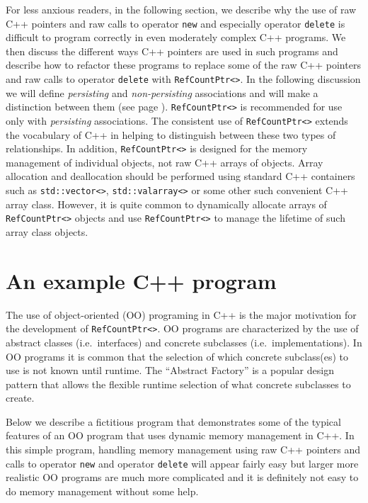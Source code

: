 \documentclass[pdf,ps2pdf,11pt]{SANDreport}
\begin{document}
For less anxious readers, in the following section, we describe why
the use of raw C++ pointers and raw calls to operator {}\texttt{new}
and especially operator {}\texttt{delete} is difficult to program
correctly in even moderately complex C++ programs.  We then discuss
the different ways C++ pointers are used in such programs and describe
how to refactor these programs to replace some of the raw C++ pointers
and raw calls to operator {}\texttt{delete} with
{}\texttt{Ref\-Count\-Ptr<>}.  In the following discussion we will
define {}\textit{persisting} and {}\textit{non-persisting}
associations and will make a distinction between them (see page
{}\pageref{rcp:non-persisting-defined}).  {}\texttt{Ref\-Count\-Ptr<>}
is recommended for use only with {}\textit{persisting} associations.
The consistent use of {}\texttt{Ref\-Count\-Ptr<>} extends the
vocabulary of C++ in helping to distinguish between these two types of
relationships.  In addition, {}\texttt{Ref\-Count\-Ptr<>} is designed
for the memory management of individual objects, not raw C++ arrays of
objects.  Array allocation and deallocation should be performed using
standard C++ containers such as {}\texttt{std\-::vector<>},
{}\texttt{std\-::valarray<>} or some other such convenient C++ array
class.  However, it is quite common to dynamically allocate arrays of
{}\texttt{Ref\-Count\-Ptr<>} objects and use
{}\texttt{Ref\-Count\-Ptr<>} to manage the lifetime of such array
class objects.

%
\section{An example C++ program}
%

The use of object-oriented (OO) programing in C++ is the major
motivation for the development of {}\texttt{Ref\-Count\-Ptr<>}.  OO
programs are characterized by the use of abstract classes
(i.e.~interfaces) and concrete subclasses (i.e.~implementations).  In
OO programs it is common that the selection of which concrete
subclass(es) to use is not known until runtime.  The ``Abstract
Factory'' {}\cite{ref:gama_et_al_1995} is a popular design pattern
that allows the flexible runtime selection of what concrete subclasses
to create.

Below we describe a fictitious program that demonstrates some of the
typical features of an OO program that uses dynamic memory management
in C++.  In this simple program, handling memory management using raw
C++ pointers and calls to operator {}\texttt{new} and operator
{}\texttt{delete} will appear fairly easy but larger more realistic OO
programs are much more complicated and it is definitely not easy to do
memory management without some help.
\end{document}
